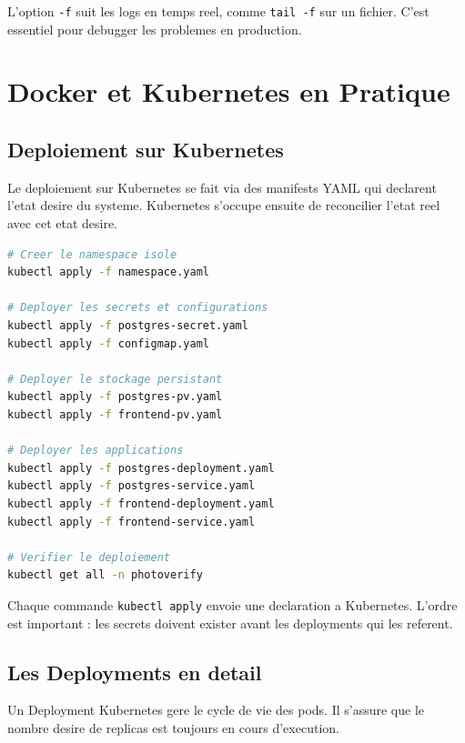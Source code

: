 \documentclass[12pt,a4paper]{article}
\begin{document}
L'option \texttt{-f} suit les logs en temps reel, comme \texttt{tail -f} sur un fichier. C'est essentiel pour debugger les problemes en production.

\section{Docker et Kubernetes en Pratique}

\subsection{Deploiement sur Kubernetes}

Le deploiement sur Kubernetes se fait via des manifests YAML qui declarent l'etat desire du systeme. Kubernetes s'occupe ensuite de reconcilier l'etat reel avec cet etat desire.

\begin{lstlisting}[language=bash, caption={Deploiement complet de l'application}]
# Creer le namespace isole
kubectl apply -f namespace.yaml

# Deployer les secrets et configurations
kubectl apply -f postgres-secret.yaml
kubectl apply -f configmap.yaml

# Deployer le stockage persistant
kubectl apply -f postgres-pv.yaml
kubectl apply -f frontend-pv.yaml

# Deployer les applications
kubectl apply -f postgres-deployment.yaml
kubectl apply -f postgres-service.yaml
kubectl apply -f frontend-deployment.yaml
kubectl apply -f frontend-service.yaml

# Verifier le deploiement
kubectl get all -n photoverify
\end{lstlisting}

Chaque commande \texttt{kubectl apply} envoie une declaration a Kubernetes. L'ordre est important : les secrets doivent exister avant les deployments qui les referent.

\subsection{Les Deployments en detail}

Un Deployment Kubernetes gere le cycle de vie des pods. Il s'assure que le nombre desire de replicas est toujours en cours d'execution.
\end{document}
